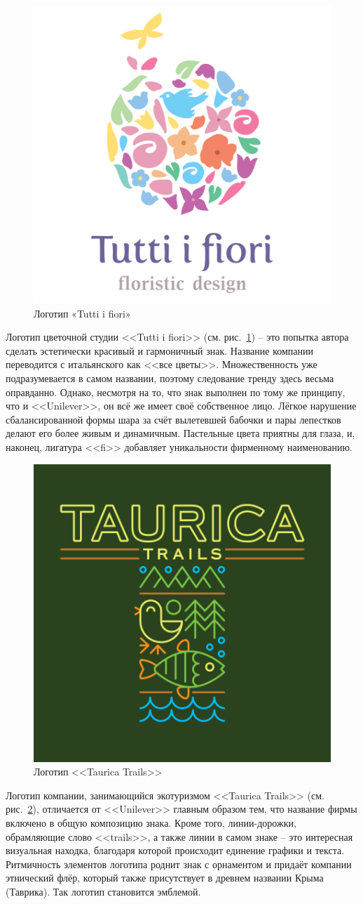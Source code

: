 \begin{figure}[h!]
  \centering
  \includegraphics[width=.3\linewidth]{images/tutti}
  \caption{Логотип «Tutti i fiori»}
  \label{fig:tutti}
\end{figure}

Логотип цветочной студии <<Tutti i fiori>> (см. рис.~\ref{fig:tutti}) -- это попытка автора сделать эстетически красивый и гармоничный знак. Название компании переводится с итальянского как <<все цветы>>. Множественность уже подразумевается в самом названии, поэтому следование тренду здесь весьма оправданно. Однако, несмотря на то, что знак выполнен по тому же принципу, что и <<Unilever>>, он всё же имеет своё собственное лицо. Лёгкое нарушение сбалансированной формы шара за счёт вылетевшей бабочки и пары лепестков делают его более живым и динамичным. Пастельные цвета приятны для глаза, и, наконец, лигатура <<fi>> добавляет уникальности фирменному наименованию.

\begin{figure}[h!]
  \centering
  \includegraphics[width=.3\linewidth]{images/taurica}
  \caption{Логотип <<Taurica Trails>>}
  \label{fig:taurica}
\end{figure}

Логотип компании, занимающийся экотуризмом <<Taurica Trails>> (см. рис.~\ref{fig:taurica}), отличается от <<Unilever>> главным образом тем, что название фирмы включено в общую композицию знака. Кроме того, линии-дорожки, обрамляющие слово <<trails>>, а также линии в самом знаке -- это интересная визуальная находка, благодаря которой происходит единение графики и текста. Ритмичность элементов логотипа роднит знак с орнаментом и придаёт компании этнический флёр, который также присутствует в древнем названии Крыма (Таврика). Так логотип становится эмблемой.

